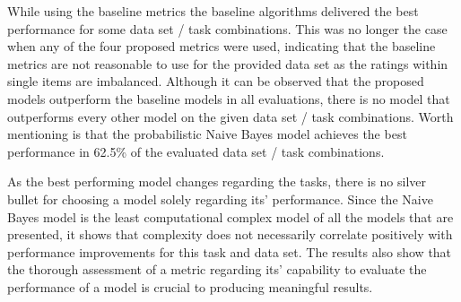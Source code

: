 While using the baseline metrics the baseline algorithms delivered the best performance for some data set / task combinations. This was no longer the case when any of the four proposed metrics were used, indicating that the baseline metrics are not reasonable to use for the provided data set as the ratings within single items are imbalanced. Although it can be observed that the proposed models outperform the baseline models in all evaluations, there is no model that outperforms every other model on the given data set / task combinations. Worth mentioning is that the probabilistic Naive Bayes model achieves the best performance in 62.5\% of the evaluated data set / task combinations. 

As the best performing model changes regarding the tasks, there is no silver bullet for choosing a model solely regarding its' performance. 
Since the Naive Bayes model is the least computational complex model of all the models that are presented, it shows that complexity does not necessarily correlate positively with performance improvements for this task and data set.
The results also show that the thorough assessment of a metric regarding its' capability to evaluate the performance of a model is crucial to producing meaningful results.


